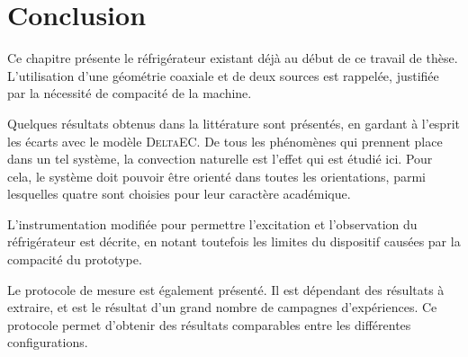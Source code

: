 \section{Conclusion}
Ce chapitre présente le réfrigérateur existant déjà au début de ce travail de thèse. L'utilisation d'une géométrie coaxiale et de deux sources est rappelée, justifiée par la nécessité de compacité de la machine.\smallskip

Quelques résultats obtenus dans la littérature sont présentés, en gardant à l'esprit les écarts avec le modèle \textsc{DeltaEC}. De tous les phénomènes qui prennent place dans un tel système, la convection naturelle est l'effet qui est étudié ici. Pour cela, le système doit pouvoir être orienté dans toutes les orientations, parmi lesquelles quatre sont choisies pour leur caractère académique.

L'instrumentation modifiée pour permettre l'excitation et l'observation du réfrigérateur est décrite, en notant toutefois les limites du dispositif causées par la compacité du prototype.

Le protocole de mesure est également présenté. Il est dépendant des résultats à extraire, et est le résultat d'un grand nombre de campagnes d'expériences. Ce protocole permet d'obtenir des résultats comparables entre les différentes configurations.




